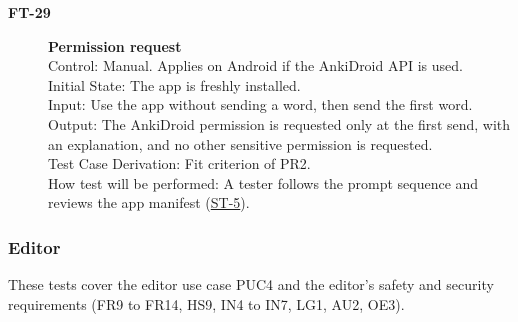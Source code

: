\documentclass[12pt, titlepage]{article}
\newcommand{\tid}[1]{\hypertarget{test:#1}{\textbf{#1}}}
\newcommand{\tref}[1]{\hyperlink{test:#1}{#1}}
\begin{document}
\begin{description}
\item[\tid{FT-29}] \textbf{Permission request}\\
Control: Manual. Applies on Android if the AnkiDroid API is used.\\
Initial State: The app is freshly installed.\\
Input: Use the app without sending a word, then send the first word.\\
Output: The AnkiDroid permission is requested only at the first send, with an
explanation, and no other sensitive permission is requested.\\
Test Case Derivation: Fit criterion of PR2.\\
How test will be performed: A tester follows the prompt sequence and reviews the
app manifest (\tref{ST-5}).

\end{description}

\subsubsection{Editor} \label{SecEditorTests}

These tests cover the editor use case PUC4 and the editor's safety and security
requirements (FR9 to FR14, HS9, IN4 to IN7, LG1, AU2, OE3).
\end{document}

